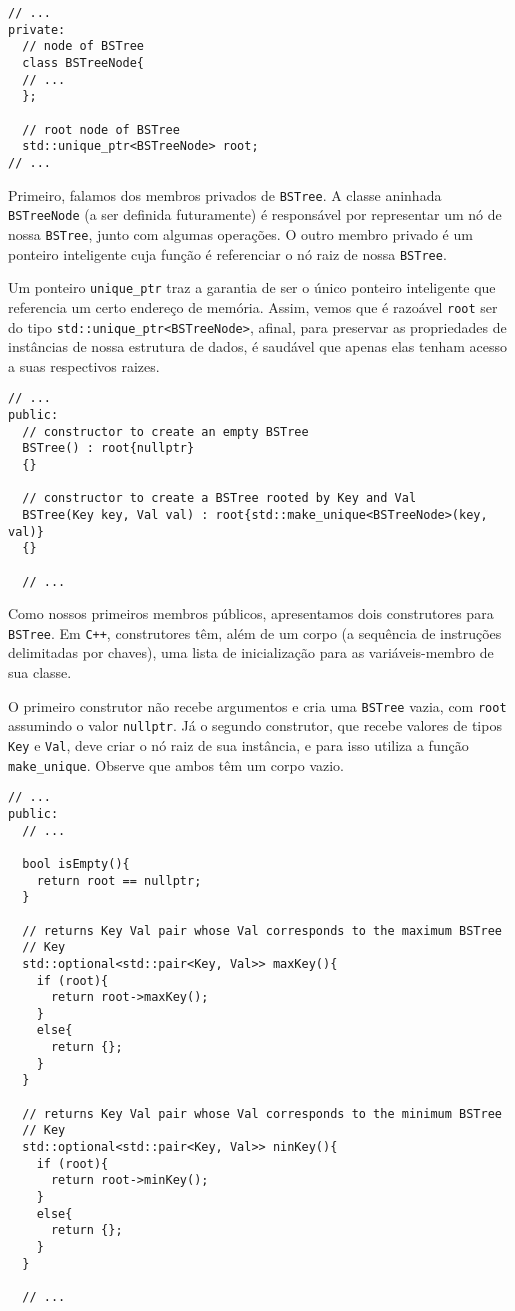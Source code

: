 \documentclass[11pt]{article}
\begin{document}
\begin{verbatim}
// ...
private:
  // node of BSTree
  class BSTreeNode{
  // ...
  };

  // root node of BSTree
  std::unique_ptr<BSTreeNode> root;
// ...
\end{verbatim}

Primeiro, falamos dos membros privados de \texttt{BSTree}.  A classe
aninhada \texttt{BSTreeNode} (a ser definida futuramente) é responsável
por representar um nó de nossa \texttt{BSTree}, junto com algumas
operações.  O outro membro privado é um ponteiro inteligente cuja
função é referenciar o nó raiz de nossa \texttt{BSTree}.

Um ponteiro \texttt{unique\_ptr} traz a garantia de ser o único ponteiro
inteligente que referencia um certo endereço de memória.  Assim,
vemos que é razoável \texttt{root} ser do tipo
\texttt{std::unique\_ptr<BSTreeNode>}, afinal, para preservar as
propriedades de instâncias de nossa estrutura de dados, é saudável
que apenas elas tenham acesso a suas respectivos raizes.

\begin{verbatim}
// ...
public:
  // constructor to create an empty BSTree
  BSTree() : root{nullptr}
  {}

  // constructor to create a BSTree rooted by Key and Val
  BSTree(Key key, Val val) : root{std::make_unique<BSTreeNode>(key, val)}
  {}

  // ...
\end{verbatim}

Como nossos primeiros membros públicos, apresentamos dois
construtores para \texttt{BSTree}.  Em \texttt{C++}, construtores têm, além de
um corpo (a sequência de instruções delimitadas por chaves), uma
lista de inicialização para as variáveis-membro de sua classe.

O primeiro construtor não recebe argumentos e cria uma \texttt{BSTree}
vazia, com \texttt{root} assumindo o valor \texttt{nullptr}.  Já o segundo
construtor, que recebe valores de tipos \texttt{Key} e \texttt{Val}, deve criar
o nó raiz de sua instância, e para isso utiliza a função
\texttt{make\_unique}.  Observe que ambos têm um corpo vazio.

\begin{verbatim}
// ...
public:
  // ...

  bool isEmpty(){
    return root == nullptr;
  }

  // returns Key Val pair whose Val corresponds to the maximum BSTree
  // Key
  std::optional<std::pair<Key, Val>> maxKey(){
    if (root){
      return root->maxKey();
    }
    else{
      return {};
    }
  }

  // returns Key Val pair whose Val corresponds to the minimum BSTree
  // Key
  std::optional<std::pair<Key, Val>> ninKey(){
    if (root){
      return root->minKey();
    }
    else{
      return {};
    }
  }

  // ...
\end{verbatim}
\end{document}

